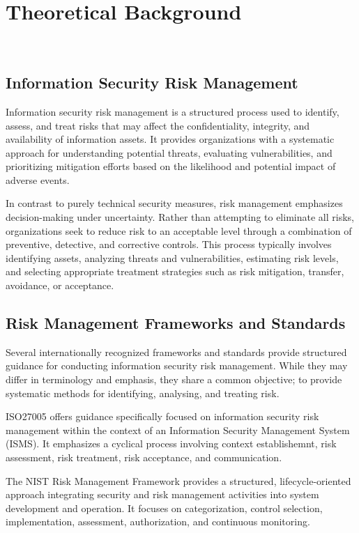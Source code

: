 \section{Theoretical Background}
~\label{chap:theoretical-background}
\subsection{Information Security Risk Management}
Information security risk management is a structured process used to identify, assess, and treat risks that may affect the confidentiality, integrity, and availability of information assets. It provides organizations with a systematic approach for understanding potential threats, evaluating vulnerabilities, and prioritizing mitigation efforts based on the likelihood and potential impact of adverse events.

In contrast to purely technical security measures, risk management emphasizes decision-making under uncertainty. Rather than attempting to eliminate all risks, organizations seek to reduce risk to an acceptable level through a combination of preventive, detective, and corrective controls. This process typically involves identifying assets, analyzing threats and vulnerabilities, estimating risk levels, and selecting appropriate treatment strategies such as risk mitigation, transfer, avoidance, or acceptance.

\subsection{Risk Management Frameworks and Standards}
Several internationally recognized frameworks and standards provide structured guidance for conducting information security risk management. While they may differ in terminology and emphasis, they share a common objective; to provide systematic methods for identifying, analysing, and treating risk.

ISO27005 offers guidance specifically focused on information security risk management within the context of an Information Security Management System (ISMS). It emphasizes a cyclical process involving context establishemnt, risk assessment, risk treatment, risk acceptance, and communication.

The NIST Risk Management Framework provides a structured, lifecycle-oriented approach integrating security and risk management activities into system development and operation. It focuses on categorization, control selection, implementation, assessment, authorization, and continuous monitoring.

